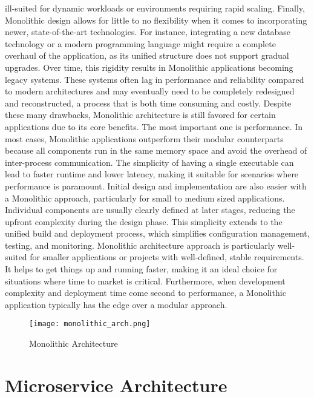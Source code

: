 ill-suited for dynamic workloads or environments requiring rapid scaling. Finally, Monolithic design allows for little to no flexibility when it comes to incorporating newer, state-of-the-art technologies. For instance, integrating a new database technology or a modern programming language might require a complete overhaul of the application, as its unified structure does not support gradual upgrades. Over time, this rigidity results in Monolithic applications becoming legacy systems. These systems often lag in performance and reliability compared to modern architectures and may eventually need to be completely redesigned and reconstructed, a process that is both time consuming and costly. Despite these many drawbacks, Monolithic architecture is still favored for certain applications due to its core benefits. The most important one is performance. In most cases, Monolithic applications outperform their modular counterparts because all components run in the same memory space and avoid the overhead of inter-process communication\cite{whatismono}. The simplicity of having a single executable can lead to faster runtime and lower latency, making it suitable for scenarios where performance is paramount. Initial design and implementation are also easier with a Monolithic approach, particularly for small to medium sized applications. Individual components are usually clearly defined at later stages, reducing the upfront complexity during the design phase. This simplicity extends to the unified build and deployment process, which simplifies configuration management, testing, and monitoring. Monolithic architecture approach is particularly well-suited for smaller applications or projects with well-defined, stable requirements. It helps to get things up and running faster, making it an ideal choice for situations where time to market is critical. Furthermore, when development complexity and deployment time come second to performance, a Monolithic application typically has the edge over a modular approach.

\begin{figure}[!h]
    \graphicspath{ {./diagrams/} }
    \texttt{[image: monolithic\_arch.png]}
    \centering
    \caption{Monolithic Architecture}
    \label{fig:mono_arch}
\end{figure}

\section{Microservice Architecture}


